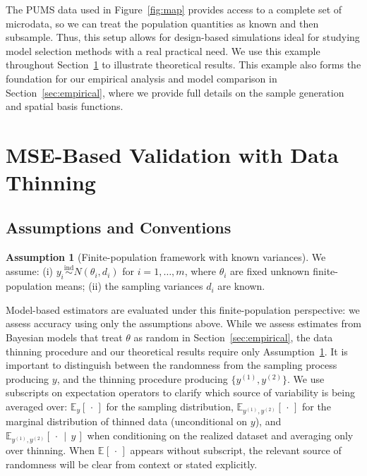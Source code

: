 \documentclass[11pt]{article}
\newcommand{\ind}{\stackrel{\text{ind}}{\sim}}
\newcommand{\given}{\,\mid\,}
\newcommand{\ytrain}{y^{(1)}}                           %
\newcommand{\ytest}{y^{(2)}}                            %
\newcommand{\E}[2][]{\mathbb{E}_{#1}\!\left[\,#2\,\right]}
\theoremstyle{plain}
\theoremstyle{definition}
\newtheorem{assumption}[theorem]{Assumption}
\theoremstyle{remark}
\begin{document}
The PUMS data used in Figure~\ref{fig:map} provides access to a complete set of microdata, so we can treat the population quantities as known and then subsample. Thus, this setup allows for design-based simulations ideal for studying model selection methods with a real practical need. We use this example throughout Section~\ref{sec:mse_validation} to illustrate theoretical results. This example also forms the foundation for our empirical analysis and model comparison in Section~\ref{sec:empirical}, where we provide full details on the sample generation and spatial basis functions.






\section{MSE-Based Validation with Data Thinning}\label{sec:mse_validation}

\subsection{Assumptions and Conventions}


\begin{assumption}[Finite-population framework with known variances]\label{assump:framework}
We assume: (i) $y_i \ind N(\theta_i, d_i)$ for $i=1, \ldots, m$, where $\theta_i$ are fixed unknown finite-population means; (ii) the sampling variances $d_i$ are known.
\end{assumption}

Model-based estimators are evaluated under this finite-population perspective: we assess accuracy using only the assumptions above. While we assess estimates from Bayesian models that treat $\theta$ as random in Section~\ref{sec:empirical}, the data thinning procedure and our theoretical results require only Assumption~\ref{assump:framework}.
It is important to distinguish between the randomness from the sampling process producing $y$, and the thinning procedure producing $\{\ytrain, \ytest\}$. We use subscripts on expectation operators to clarify which source of variability is being averaged over: $\E[y]{\cdot}$ for the sampling distribution, $\E[\ytrain,\ytest]{\cdot}$ for the marginal distribution of thinned data (unconditional on $y$), and $\E[\ytrain,\ytest]{\cdot \given y}$ when conditioning on the realized dataset and averaging only over thinning. When $\E{\cdot}$ appears without subscript, the relevant source of randomness will be clear from context or stated explicitly.
\end{document}
